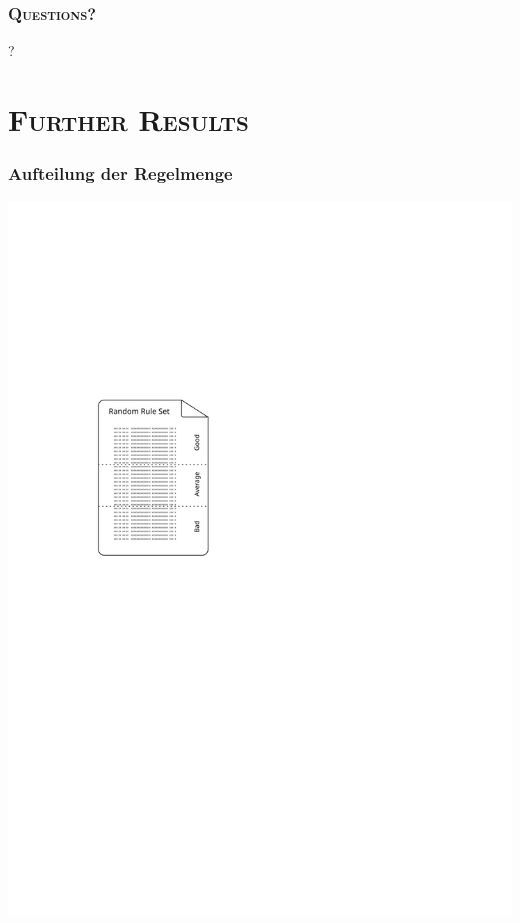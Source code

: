 \documentclass[xcolor=x11names,compress]{beamer}
\renewcommand{\(}{\begin{columns}}
\renewcommand{\)}{\end{columns}}
\newcommand{\<}[1]{\begin{column}{#1}}
\renewcommand{\>}{\end{column}}
\begin{document}
\section{}
\begin{frame}
  \frametitle{\scshape Questions?}
  \centering\Huge{?}
\end{frame}

\appendix
\section{\scshape Further Results}
\begin{frame}[noframenumbering]
  \frametitle{Aufteilung der Regelmenge}
  \centering\includegraphics[height=0.9\textheight]{figures/rule-thirds}
\end{frame}
\end{document}
